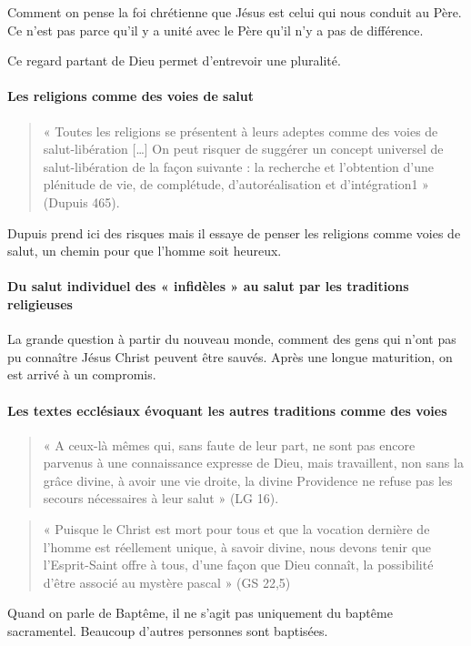  Comment on pense la foi chrétienne que Jésus est celui qui nous conduit au Père. Ce n'est pas parce qu'il y a unité avec le Père qu'il n'y a pas de différence.
 
 Ce regard partant de Dieu permet d'entrevoir une pluralité.
 
 \paragraph{Les religions comme des voies de salut }
 
 \begin{quote}
     « Toutes les religions se présentent à leurs adeptes comme des voies de salut-libération  […] On peut risquer de suggérer un concept universel de salut-libération de la façon suivante : la recherche et l’obtention d’une plénitude de vie, de complétude, d’autoréalisation et d’intégration1 » (Dupuis 465).   
 \end{quote}
 Dupuis prend ici des risques mais il essaye de penser les religions comme voies de salut, un chemin pour que l'homme soit heureux. 
 
 \paragraph{Du salut individuel des « infidèles » au salut par les traditions religieuses }
 
 La grande question à partir du nouveau monde, comment des gens qui n'ont pas pu connaître Jésus Christ peuvent être sauvés. Après une longue maturition, on est arrivé à un compromis.
 

 \paragraph{Les textes ecclésiaux évoquant les autres traditions comme des voies }
 
 
 \begin{quote}
     « A ceux-là mêmes qui, sans faute de leur part, ne sont pas encore parvenus à une connaissance expresse de Dieu, mais travaillent, non sans la grâce divine, à avoir une vie droite, la divine Providence ne refuse pas les secours nécessaires à leur salut » (LG 16). 
 \end{quote}
 
 \begin{quote}
     « Puisque le Christ est mort pour tous et que la vocation dernière de l’homme est réellement unique, à savoir divine, nous devons tenir que l’Esprit-Saint offre à tous, d’une façon que Dieu connaît, la possibilité d’être associé au mystère pascal » (GS 22,5) 
 \end{quote}
Quand on parle de Baptême, il ne s'agit pas uniquement du baptême sacramentel. Beaucoup d'autres personnes sont baptisées.

